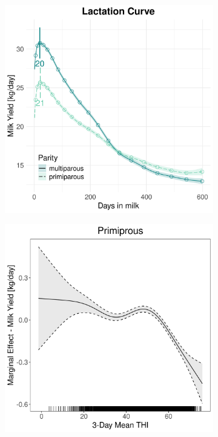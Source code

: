 \begin{figure}[H]
\begin{subfigure}[b]{0.45\textwidth}
        \includegraphics[width=\textwidth]{thesis/figures/models/milk/full/bs_milk_full/bs_milk_full_marginal_dim_milk_combined.png}
    \end{subfigure}
    \begin{subfigure}[b]{0.45\textwidth}
        \centering
        \includegraphics[width=\textwidth]{thesis/figures/models/milk/full/bs_milk_full/bs_milk_full_marginal_thi_milk_primi.png}

\end{subfigure}
\end{figure}
